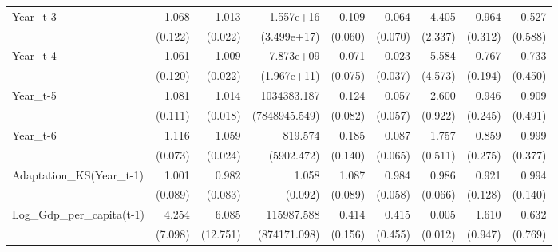 \begin{table}[htbp]
\begin{tabular}{l*{8}{D{.}{.}{-1}}}
Year\_t-3    &       1.068         &       1.013         &   1.557e+16\sym{*}  &       0.109\sym{***}&       0.064\sym{**} &       4.405\sym{***}&       0.964         &       0.527         \\
            &     (0.122)         &     (0.022)         & (3.499e+17)         &     (0.060)         &     (0.070)         &     (2.337)         &     (0.312)         &     (0.588)         \\
Year\_t-4    &       1.061         &       1.009         &   7.873e+09         &       0.071\sym{**} &       0.023\sym{**} &       5.584\sym{**} &       0.767         &       0.733         \\
            &     (0.120)         &     (0.022)         & (1.967e+11)         &     (0.075)         &     (0.037)         &     (4.573)         &     (0.194)         &     (0.450)         \\
Year\_t-5    &       1.081         &       1.014         & 1034383.187\sym{*}  &       0.124\sym{***}&       0.057\sym{***}&       2.600\sym{***}&       0.946         &       0.909         \\
            &     (0.111)         &     (0.018)         &(7848945.549)         &     (0.082)         &     (0.057)         &     (0.922)         &     (0.245)         &     (0.491)         \\
Year\_t-6    &       1.116\sym{*}  &       1.059\sym{**} &     819.574         &       0.185\sym{**} &       0.087\sym{***}&       1.757\sym{*}  &       0.859         &       0.999         \\
            &     (0.073)         &     (0.024)         &  (5902.472)         &     (0.140)         &     (0.065)         &     (0.511)         &     (0.275)         &     (0.377)         \\
Adaptation\_KS(Year\_t-1)&       1.001         &       0.982         &       1.058         &       1.087         &       0.984         &       0.986         &       0.921         &       0.994         \\
            &     (0.089)         &     (0.083)         &     (0.092)         &     (0.089)         &     (0.058)         &     (0.066)         &     (0.128)         &     (0.140)         \\
Log\_Gdp\_per\_capita(t-1)&       4.254         &       6.085         &  115987.588\sym{\%}  &       0.414\sym{**} &       0.415         &       0.005\sym{**} &       1.610         &       0.632         \\
            &     (7.098)         &    (12.751)         &(874171.098)         &     (0.156)         &     (0.455)         &     (0.012)         &     (0.947)         &     (0.769)         \\

\end{tabular}
\end{table}

